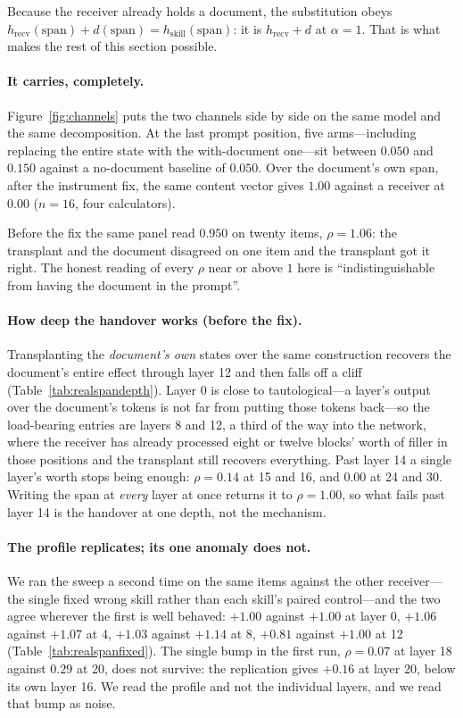 \documentclass{article}
\newcommand{\dvec}{\ensuremath{d}}
\begin{document}
Because the receiver already holds a document, the substitution obeys
$h_{\text{recv}}(\text{span}) + \dvec(\text{span}) = h_{\text{skill}}(\text{span})$: it is $h_{\text{recv}} + \dvec$ at $\alpha=1$. That is
what makes the rest of this section possible.

\paragraph{It carries, completely.} Figure~\ref{fig:channels} puts the two
channels side by side on the same model and the same decomposition. At the last
prompt position, five arms---including replacing the entire state with the
with-document one---sit between $0.050$ and $0.150$ against a no-document
baseline of $0.050$. Over the document's own span, after the instrument fix,
the same content vector gives $1.00$ against a receiver at $0.00$ ($n=16$, four
calculators).

Before the fix the same panel read $0.950$ on twenty items, $\rho = 1.06$: the
transplant and the document disagreed on one item and the transplant got it
right. The honest reading of every $\rho$ near or above $1$ here is
``indistinguishable from having the document in the prompt''.



\paragraph{How deep the handover works (before the fix).} Transplanting the \emph{document's own}
states over the same construction recovers the document's entire effect through
layer 12 and then falls off a cliff (Table~\ref{tab:realspandepth}). Layer 0 is
close to tautological---a layer's output over the document's tokens is not far
from putting those tokens back---so the load-bearing entries are layers 8 and
12, a third of the way into
the network, where the receiver has already processed eight or twelve blocks'
worth of filler in those positions and the transplant still recovers
everything. Past layer 14 a single layer's worth stops being enough: $\rho =
0.14$ at 15 and 16, and $0.00$ at 24 and 30. Writing
the span at \emph{every} layer at once returns it to $\rho = 1.00$, so what
fails past layer 14 is the handover at one depth, not the mechanism.

\paragraph{The profile replicates; its one anomaly does not.} We ran the sweep a
second time on the same items against the other receiver---the single fixed
wrong skill rather than each skill's paired control---and the two agree wherever
the first is well behaved: $+1.00$ against $+1.00$ at layer 0, $+1.06$ against
$+1.07$ at 4, $+1.03$ against $+1.14$ at 8, $+0.81$ against $+1.00$ at 12
(Table~\ref{tab:realspanfixed}). The single bump in the first run, $\rho=0.07$
at layer 18 against $0.29$ at 20, does not survive: the replication gives $+0.16$
at layer 20, below its own layer 16. We read the profile and not the individual
layers, and we read that bump as noise.
\end{document}
